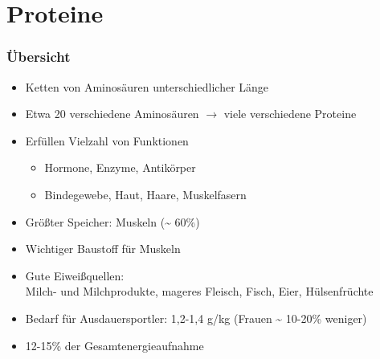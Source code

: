 \documentclass[ngerman, aspectratio=169]{beamer}
\begin{document}
\section{Proteine}
\begin{frame}
  \frametitle{Übersicht}
  \begin{itemize}
  \item<+-> Ketten von Aminosäuren unterschiedlicher Länge
  \item<+-> Etwa 20 verschiedene Aminosäuren $→$ viele verschiedene Proteine
  \item<+-> Erfüllen Vielzahl von Funktionen
    \begin{itemize}
    \item Hormone, Enzyme, Antikörper
    \item Bindegewebe, Haut, Haare, Muskelfasern
    \end{itemize}
  \item<+-> Größter Speicher: Muskeln (\~{} 60\%)
  \item<+-> Wichtiger Baustoff für Muskeln
  \item<+-> Gute Eiweißquellen:\\ Milch- und Milchprodukte, mageres Fleisch, Fisch, Eier, Hülsenfrüchte
  \item<+-> Bedarf für Ausdauersportler: 1,2-1,4 g/kg (Frauen \~{} 10-20\% weniger)
  \item<+-> 12-15\% der Gesamtenergieaufnahme

  \end{itemize}

  
\end{frame}
\end{document}
